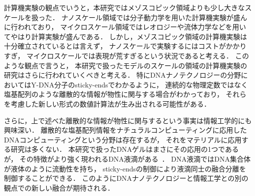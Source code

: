計算機実験の観点でいうと，本研究ではメゾスコピック領域よりも少し大きなスケールを扱った．
ナノスケール領域では分子動力学を用いた計算機実験が盛んに行われており，
マイクロスケール領域ではレオロジーや流体力学などを用いてやはり計算実験が盛んである．
しかし，メゾスコピック領域の計算機実験は十分確立されているとは言えず，
ナノスケールで実験するにはコストがかかりすぎ，
マイクロスケールでは表現が荒すぎるという状況であると考える．
このような観点で言うと，
本研究で扱ったモデルのスケールの領域の計算機実験の研究はさらに行われていくべきと考える．
特にDNAナノテクノロジーの分野においてはY-DNA分子のsticky-endsでわかるように，
連続的な物理定数ではなく塩基配列のような離散的な情報が物性に関与する場合がわかっており，
それらを考慮した新しい形式の数値計算法が生み出される可能性がある．

さらに，上で述べた離散的な情報が物性に関与するという事実は情報工学的にも興味深い．
離散的な塩基配列情報をナチュラルコンピューティングに応用したDNAコンピューティングという分野は存在するが，
それをマテリアルに応用する研究は多くない．
本研究で扱ったDNAゲルはまさにその応用の1つであるが，
その特徴がより強く現われるDNA液滴がある~\cite{sato2019sequence}．
DNA液滴ではDNA集合体が液体のように流動性を持ち，
sticky-endsの制御により液滴同士の融合分離を制御することができる．
このようにDNAナノテクノロジーと情報工学との別の観点での新しい融合が期待される．

